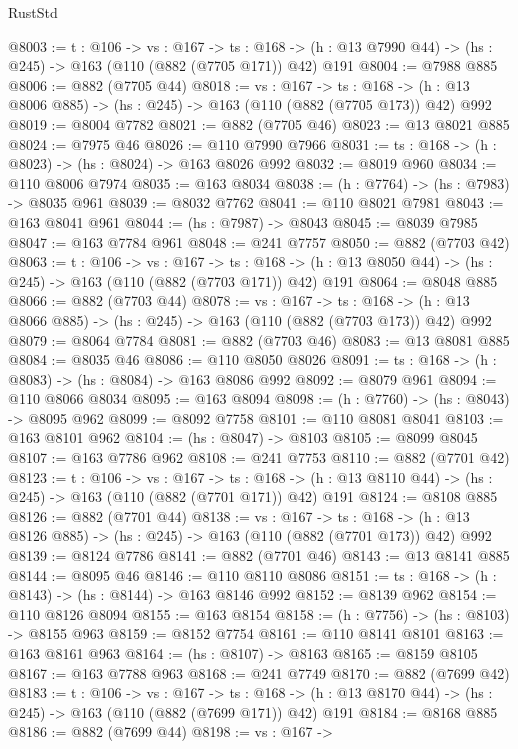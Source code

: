 \begin{lexlean}{RustStd}
\begin{coremodule}
@8003 := {t : @106} ->
  {vs : @167} ->
  {ts : @168} -> (h : @13 @7990 @44) -> (hs : @245) -> @163 (@110 (@882 (@7705 @171)) @42) @191
@8004 := @7988 @885
@8006 := @882 (@7705 @44)
@8018 := {vs : @167} ->
  {ts : @168} -> (h : @13 @8006 @885) -> (hs : @245) -> @163 (@110 (@882 (@7705 @173)) @42) @992
@8019 := @8004 @7782
@8021 := @882 (@7705 @46)
@8023 := @13 @8021 @885
@8024 := @7975 @46
@8026 := @110 @7990 @7966
@8031 := {ts : @168} -> (h : @8023) -> (hs : @8024) -> @163 @8026 @992
@8032 := @8019 @960
@8034 := @110 @8006 @7974
@8035 := @163 @8034
@8038 := (h : @7764) -> (hs : @7983) -> @8035 @961
@8039 := @8032 @7762
@8041 := @110 @8021 @7981
@8043 := @163 @8041 @961
@8044 := (hs : @7987) -> @8043
@8045 := @8039 @7985
@8047 := @163 @7784 @961
@8048 := @241 @7757
@8050 := @882 (@7703 @42)
@8063 := {t : @106} ->
  {vs : @167} ->
  {ts : @168} -> (h : @13 @8050 @44) -> (hs : @245) -> @163 (@110 (@882 (@7703 @171)) @42) @191
@8064 := @8048 @885
@8066 := @882 (@7703 @44)
@8078 := {vs : @167} ->
  {ts : @168} -> (h : @13 @8066 @885) -> (hs : @245) -> @163 (@110 (@882 (@7703 @173)) @42) @992
@8079 := @8064 @7784
@8081 := @882 (@7703 @46)
@8083 := @13 @8081 @885
@8084 := @8035 @46
@8086 := @110 @8050 @8026
@8091 := {ts : @168} -> (h : @8083) -> (hs : @8084) -> @163 @8086 @992
@8092 := @8079 @961
@8094 := @110 @8066 @8034
@8095 := @163 @8094
@8098 := (h : @7760) -> (hs : @8043) -> @8095 @962
@8099 := @8092 @7758
@8101 := @110 @8081 @8041
@8103 := @163 @8101 @962
@8104 := (hs : @8047) -> @8103
@8105 := @8099 @8045
@8107 := @163 @7786 @962
@8108 := @241 @7753
@8110 := @882 (@7701 @42)
@8123 := {t : @106} ->
  {vs : @167} ->
  {ts : @168} -> (h : @13 @8110 @44) -> (hs : @245) -> @163 (@110 (@882 (@7701 @171)) @42) @191
@8124 := @8108 @885
@8126 := @882 (@7701 @44)
@8138 := {vs : @167} ->
  {ts : @168} -> (h : @13 @8126 @885) -> (hs : @245) -> @163 (@110 (@882 (@7701 @173)) @42) @992
@8139 := @8124 @7786
@8141 := @882 (@7701 @46)
@8143 := @13 @8141 @885
@8144 := @8095 @46
@8146 := @110 @8110 @8086
@8151 := {ts : @168} -> (h : @8143) -> (hs : @8144) -> @163 @8146 @992
@8152 := @8139 @962
@8154 := @110 @8126 @8094
@8155 := @163 @8154
@8158 := (h : @7756) -> (hs : @8103) -> @8155 @963
@8159 := @8152 @7754
@8161 := @110 @8141 @8101
@8163 := @163 @8161 @963
@8164 := (hs : @8107) -> @8163
@8165 := @8159 @8105
@8167 := @163 @7788 @963
@8168 := @241 @7749
@8170 := @882 (@7699 @42)
@8183 := {t : @106} ->
  {vs : @167} ->
  {ts : @168} -> (h : @13 @8170 @44) -> (hs : @245) -> @163 (@110 (@882 (@7699 @171)) @42) @191
@8184 := @8168 @885
@8186 := @882 (@7699 @44)
@8198 := {vs : @167} ->

\end{coremodule}
\end{lexlean}
